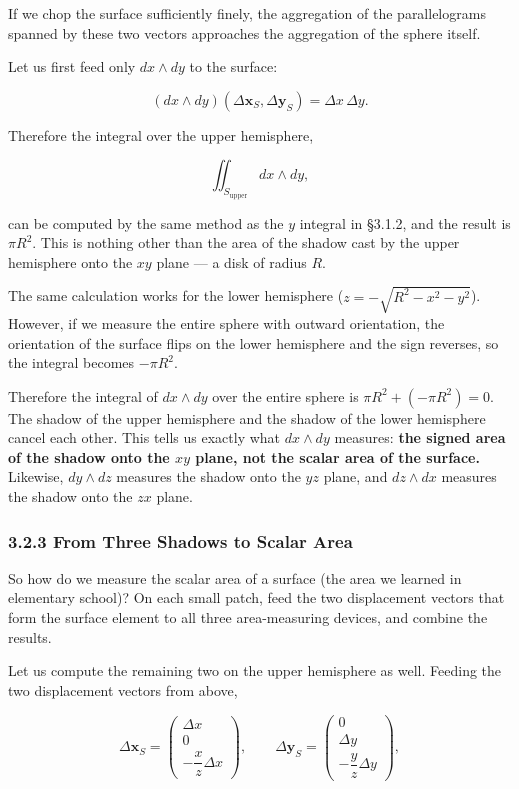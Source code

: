 If we chop the surface sufficiently finely, the aggregation of the
parallelograms spanned by these two vectors approaches the aggregation
of the sphere itself.

Let us first feed only \(dx \wedge dy\) to the surface:

\[(dx \wedge dy)(\Delta\mathbf{x}_S,\Delta\mathbf{y}_S)=\Delta x\,\Delta y.\]

Therefore the integral over the upper hemisphere,

\[
\iint_{S_{\text{upper}}} dx \wedge dy,
\]

can be computed by the same method as the \(y\) integral in §3.1.2, and
the result is \(\pi R^2\). This is nothing other than the area of the
shadow cast by the upper hemisphere onto the \(xy\) plane --- a disk of
radius \(R\).

The same calculation works for the lower hemisphere
(\(z = -\sqrt{R^2 - x^2 - y^2}\)). However, if we measure the entire
sphere with outward orientation, the orientation of the surface flips on
the lower hemisphere and the sign reverses, so the integral becomes
\(-\pi R^2\).

Therefore the integral of \(dx \wedge dy\) over the entire sphere is
\(\pi R^2 + (-\pi R^2) = 0\). The shadow of the upper hemisphere and the
shadow of the lower hemisphere cancel each other. This tells us exactly
what \(dx \wedge dy\) measures:
\textbf{the signed area of the shadow onto the $xy$ plane, not the scalar area of the surface.}
Likewise, \(dy \wedge dz\) measures the shadow onto the \(yz\) plane,
and \(dz \wedge dx\) measures the shadow onto the \(zx\) plane.

\hypertarget{from-three-shadows-to-scalar-area}{%
\subsubsection{3.2.3 From Three Shadows to Scalar
Area}\label{from-three-shadows-to-scalar-area}}

So how do we measure the scalar area of a surface (the area we learned
in elementary school)? On each small patch, feed the two displacement
vectors that form the surface element to all three area-measuring
devices, and combine the results.

Let us compute the remaining two on the upper hemisphere as well.
Feeding the two displacement vectors from above,

\[\Delta\mathbf{x}_S=\begin{pmatrix}\Delta x\\0\\-\dfrac{x}{z}\Delta x\end{pmatrix},\qquad
\Delta\mathbf{y}_S=\begin{pmatrix}0\\\Delta y\\-\dfrac{y}{z}\Delta y\end{pmatrix},\]

